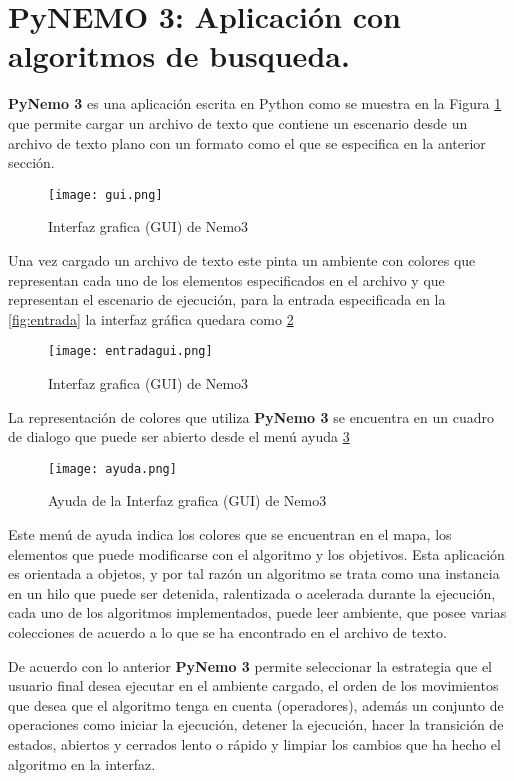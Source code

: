\section{PyNEMO 3: Aplicaci\'on con algoritmos de busqueda.}

\textbf{PyNemo 3} es una aplicaci\'on escrita en Python \cite{wiki:python} como se muestra en la Figura \ref{fig:gui} que permite cargar un archivo de texto que contiene un escenario desde un archivo de texto plano con un formato como el que se especifica en la anterior secci\'on.
\begin{figure}[!h]
	\centering
	\texttt{[image: gui.png]}
	\caption{Interfaz grafica (GUI) de Nemo3}
	\label{fig:gui}
\end{figure}

Una vez cargado un archivo de texto este pinta un ambiente con colores que representan cada uno de los elementos especificados en el archivo y que representan el escenario de ejecuci\'on, para la entrada especificada en la \ref{fig:entrada} la interfaz gr\'afica quedara como \ref{fig:entradagui}
\begin{figure}[!h]
	\centering
	\texttt{[image: entradagui.png]}
	\caption{Interfaz grafica (GUI) de Nemo3}
	\label{fig:entradagui}
\end{figure}

La representaci\'on de colores que utiliza \textbf{PyNemo 3} se encuentra en un cuadro de dialogo que puede ser abierto desde el men\'u ayuda \ref{fig:ayuda}
\begin{figure}[!h]
	\centering
	\texttt{[image: ayuda.png]}
	\caption{Ayuda de la Interfaz grafica (GUI) de Nemo3}
	\label{fig:ayuda}
\end{figure}

Este men\'u de ayuda indica los colores que se encuentran en el mapa, los elementos que puede modificarse con el algoritmo y los objetivos.
Esta aplicaci\'on es orientada a objetos, y por tal raz\'on un algoritmo se trata como una instancia en un hilo que puede ser detenida, ralentizada o acelerada durante la ejecuci\'on, cada uno de los algoritmos implementados, puede leer ambiente, que posee varias colecciones de acuerdo a lo que se ha encontrado en el archivo de texto.

De acuerdo con lo anterior \textbf{PyNemo 3} permite seleccionar la estrategia que el usuario final desea ejecutar en el ambiente cargado, el orden de los movimientos que desea que el algoritmo tenga en cuenta (operadores), adem\'as un conjunto de operaciones como iniciar la ejecuci\'on, detener la ejecuci\'on, hacer la transici\'on de estados, abiertos y cerrados lento o r\'apido y limpiar los cambios que ha hecho el algoritmo en la interfaz.

